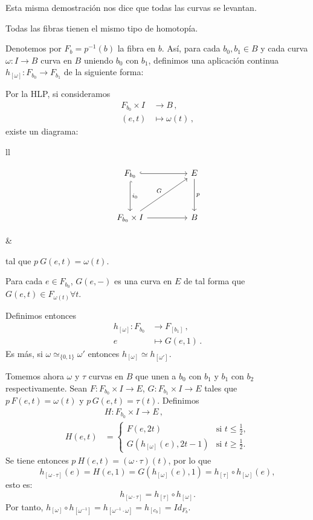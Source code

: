 Esta misma demostración nos dice que todas las curvas se levantan.
\begin{teor}
Todas las fibras tienen el mismo tipo de homotopía.
\end{teor}
\begin{demo}
Denotemos por $F_b = p^{-1}(b)$ la fibra en $b$. Así, para cada $b_0, b_1 \in B$ y cada curva $\omega : I \longrightarrow B$ curva en $B$ uniendo $b_0$ con $b_1$, definimos una aplicación continua $h_{[\omega]} : F_{b_0} \longrightarrow F_{b_1}$ de la siguiente forma: \par 
Por la HLP, si consideramos 
\begin{align*}
F_{b_0} \times I &\longrightarrow B \, , \\
(e, t) &\longmapsto \omega(t) \, ,
\end{align*}
existe un diagrama: \par
\begin{tabular}{ll}
\begin{minipage}{0.5\textwidth}
\[
\begin{tikzcd}
F_{b_0} \arrow[hook]{rr} \arrow[hook]{dd}{i_0} & & E \arrow{dd}{p} \\
\\
F_{b_0} \times I \arrow{rr} \arrow{uurr}{G} & & B
\end{tikzcd}
\]
\end{minipage}
&
\begin{minipage}{0.5\textwidth}
tal que $p \: G(e,t) = \omega(t)$.
\end{minipage}
\end{tabular}
Para cada $e \in F_{b_0}$, $G(e,-)$ es una curva en $E$ de tal forma que $G(e,t) \in F_{\omega(t)} \forall t$. \par
Definimos entonces
\begin{align*}
h_{[\omega]} : F_{b_0} &\longrightarrow F_{[b_1]} \, , \\
e &\longmapsto G(e,1) \, .
\end{align*}
Es más, si $\omega \simeq_{\{0,1\}} \omega'$ entonces $h_{[\omega]} \simeq h_{[\omega']}$. \par
Tomemos ahora $\omega$ y $\tau$ curvas en $B$ que unen a $b_0$ con $b_1$ y $b_1$ con $b_2$ respectivamente. Sean $F : F_{b_0} \times I \longrightarrow E$, $G: F_{b_1} \times I \longrightarrow E$ tales que $p \, F(e,t) = \omega(t)$ y $p \, G(e,t) = \tau(t)$. Definimos
\begin{align*}
& H : F_{b_0} \times I \longrightarrow E \, , \\
H(e,t) &= \begin{cases}
F(e, 2t) & \text{si } t \leq \frac{1}{2}, \\
G(h_{[\omega]}(e), 2t -1) & \text{si } t \geq \frac{1}{2}.
\end{cases}
\end{align*}
Se tiene entonces $p \: H(e,t) = (\omega \cdotp \tau)(t)$, por lo que 
\[
h_{[\omega \cdotp \tau]} (e) = H(e,1) = G(h_{[\omega]}(e), 1) = 
h_{[\tau]} \circ h_{[\omega]}(e) ,
\]
esto es:
\[ h_{[\omega \cdotp \tau]} = h_{[\tau]} \circ h_{[\omega]}. \]
Por tanto, $h_{[\omega]} \circ h_{[\omega^{-1}]} = h_{[\omega^{-1} \cdotp \omega]} = h_{[c_b]} = Id_{F_b}$.
\end{demo}
